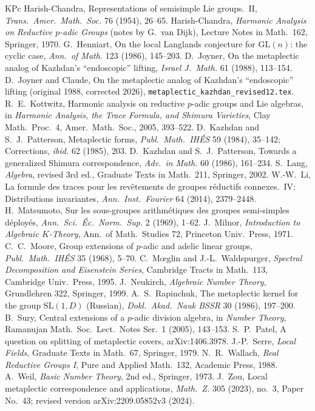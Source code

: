 \documentclass[12pt]{article}
\newcommand{\GL}{\mathrm{GL}}
\theoremstyle{plain}
\theoremstyle{definition}
\begin{document}
\begin{thebibliography}{KPc}
 Harish-Chandra, Representations of semisimple Lie groups.\ II, \emph{Trans.\ Amer.\ Math.\ Soc.} 76 (1954), 26--65.
 Harish-Chandra, \emph{Harmonic Analysis on Reductive $p$-adic Groups} (notes by G.~van Dijk), Lecture Notes in Math.\ 162, Springer, 1970.
 G.~Henniart, On the local Langlands conjecture for $\GL(n)$: the cyclic case, \emph{Ann.\ of Math.} 123 (1986), 145--203.
 D.~Joyner, On the metaplectic analog of Kazhdan's ``endoscopic'' lifting, \emph{Israel J.\ Math.} 61 (1988), 113--154.
 D.~Joyner and Claude, On the metaplectic analog of Kazhdan's ``endoscopic'' lifting (original 1988, corrected 2026), \texttt{metaplectic\_kazhdan\_revised12.tex}.
 R.~E.~Kottwitz, Harmonic analysis on reductive $p$-adic groups and Lie algebras, in \emph{Harmonic Analysis, the Trace Formula, and Shimura Varieties}, Clay Math.\ Proc.\ 4, Amer.\ Math.\ Soc., 2005, 393--522.
 D.~Kazhdan and S.~J.~Patterson, Metaplectic forms, \emph{Publ.\ Math.\ IH\'ES} 59 (1984), 35--142; Corrections, \emph{ibid.} 62 (1985), 203.
 D.~Kazhdan and S.~J.~Patterson, Towards a generalized Shimura correspondence, \emph{Adv.\ in Math.} 60 (1986), 161--234.
 S.~Lang, \emph{Algebra}, revised 3rd ed., Graduate Texts in Math.\ 211, Springer, 2002.
 W.-W.~Li, La formule des traces pour les rev\^etements de groupes r\'eductifs connexes.\ IV: Distributions invariantes, \emph{Ann.\ Inst.\ Fourier} 64 (2014), 2379--2448.
 H.~Matsumoto, Sur les sous-groupes arithm\'etiques des groupes semi-simples d\'eploy\'es, \emph{Ann.\ Sci.\ \'Ec.\ Norm.\ Sup.} 2 (1969), 1--62.
 J.~Milnor, \emph{Introduction to Algebraic $K$-Theory}, Ann.\ of Math.\ Studies 72, Princeton Univ.\ Press, 1971.
 C.~C.~Moore, Group extensions of $p$-adic and adelic linear groups, \emph{Publ.\ Math.\ IH\'ES} 35 (1968), 5--70.
 C.~M\oe glin and J.-L.~Waldspurger, \emph{Spectral Decomposition and Eisenstein Series}, Cambridge Tracts in Math.\ 113, Cambridge Univ.\ Press, 1995.
 J.~Neukirch, \emph{Algebraic Number Theory}, Grundlehren 322, Springer, 1999.
 A.~S.~Rapinchuk, The metaplectic kernel for the group $\mathrm{SL}(1,D)$ (Russian), \emph{Dokl.\ Akad.\ Nauk BSSR} 30 (1986), 197--200.
 B.~Sury, Central extensions of a $p$-adic division algebra, in \emph{Number Theory}, Ramanujan Math.\ Soc.\ Lect.\ Notes Ser.\ 1 (2005), 143--153.
 S.~P.~Patel, A question on splitting of metaplectic covers, arXiv:1406.3978.
 J.-P.~Serre, \emph{Local Fields}, Graduate Texts in Math.\ 67, Springer, 1979.
 N.~R.~Wallach, \emph{Real Reductive Groups I}, Pure and Applied Math.\ 132, Academic Press, 1988.
 A.~Weil, \emph{Basic Number Theory}, 2nd ed., Springer, 1973.
 J.~Zou, Local metaplectic correspondence and applications, \emph{Math.\ Z.} 305 (2023), no.~3, Paper No.~43; revised version arXiv:2209.05852v3 (2024).
\end{thebibliography}
\end{document}
